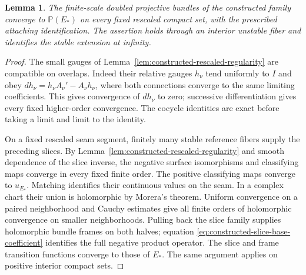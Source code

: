 \documentclass[11pt]{amsart}
\newtheorem{lemma}[theorem]{Lemma}
\theoremstyle{definition}
\theoremstyle{remark}
\theoremstyle{plain}
\newcommand{\PP}{\mathbb{P}}
\begin{document}
\begin{lemma}\label{lem:constructed-holomorphic-limit}
The finite-scale doubled projective bundles of the constructed family
converge to $\PP(E_*)$ on every fixed rescaled compact set, with the
prescribed attaching identification. The assertion holds through an
interior unstable fiber and identifies the stable extension at infinity.
\end{lemma}

\begin{proof}
The small gauges of Lemma~\ref{lem:constructed-rescaled-regularity}
are compatible on overlaps. Indeed their relative gauges $h_\nu$ tend
uniformly to $I$ and obey $dh_\nu=h_\nu A_\nu'-A_\nu h_\nu$,
where both connections converge to the same limiting coefficients.
This gives convergence of $dh_\nu$ to zero; successive differentiation
gives every fixed higher-order convergence. The cocycle identities are
exact before taking a limit and limit to the identity.

On a fixed rescaled seam segment, finitely many stable reference
fibers supply the preceding slices. By
Lemma~\ref{lem:constructed-rescaled-regularity} and smooth dependence of
the slice inverse, the negative surface isomorphisms and classifying
maps converge in every fixed finite order. The positive classifying
maps converge to $u_{E_*}$. Matching identifies their continuous values
on the seam. In a complex chart their union is holomorphic by Morera's
theorem. Uniform convergence on a paired neighborhood and Cauchy
estimates give all finite orders of holomorphic convergence on smaller
neighborhoods. Pulling back the slice family supplies holomorphic bundle
frames on both halves; equation
\eqref{eq:constructed-slice-base-coefficient} identifies the full
negative product operator. The slice and frame transition functions
converge to those of $E_*$. The same argument applies on positive
interior compact sets.


\end{proof}
\end{document}
